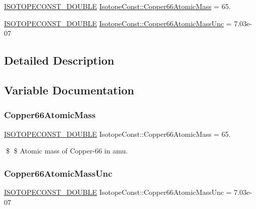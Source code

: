 \begin{DoxyCompactItemize}
\item 
\mbox{\hyperlink{group___isotope_const-_macros_ga8f45a7272ce02c0b4c65c44636ed719a}{I\+S\+O\+T\+O\+P\+E\+C\+O\+N\+S\+T\+\_\+\+D\+O\+U\+B\+LE}} \mbox{\hyperlink{group___isotope_const-_copper-_cu66_ga62a3b4ae1fc72746dd9d9cb74024d3b8}{Isotope\+Const\+::\+Copper66\+Atomic\+Mass}} = 65.
\item 
\mbox{\hyperlink{group___isotope_const-_macros_ga8f45a7272ce02c0b4c65c44636ed719a}{I\+S\+O\+T\+O\+P\+E\+C\+O\+N\+S\+T\+\_\+\+D\+O\+U\+B\+LE}} \mbox{\hyperlink{group___isotope_const-_copper-_cu66_gacd2aaf9bba63e92c372d9fff5aef5cf2}{Isotope\+Const\+::\+Copper66\+Atomic\+Mass\+Unc}} = 7.\+03e-\/07
\end{DoxyCompactItemize}


\subsection{Detailed Description}


\subsection{Variable Documentation}
\mbox{\label{group___isotope_const-_copper-_cu66_ga62a3b4ae1fc72746dd9d9cb74024d3b8}} 
\subsubsection{\texorpdfstring{Copper66\+Atomic\+Mass}{Copper66AtomicMass}}
{\footnotesize\ttfamily \mbox{\hyperlink{group___isotope_const-_macros_ga8f45a7272ce02c0b4c65c44636ed719a}{I\+S\+O\+T\+O\+P\+E\+C\+O\+N\+S\+T\+\_\+\+D\+O\+U\+B\+LE}} Isotope\+Const\+::\+Copper66\+Atomic\+Mass = 65.}

\$ \$ Atomic mass of Copper-\/66 in amu. \mbox{\label{group___isotope_const-_copper-_cu66_gacd2aaf9bba63e92c372d9fff5aef5cf2}} 
\subsubsection{\texorpdfstring{Copper66\+Atomic\+Mass\+Unc}{Copper66AtomicMassUnc}}
{\footnotesize\ttfamily \mbox{\hyperlink{group___isotope_const-_macros_ga8f45a7272ce02c0b4c65c44636ed719a}{I\+S\+O\+T\+O\+P\+E\+C\+O\+N\+S\+T\+\_\+\+D\+O\+U\+B\+LE}} Isotope\+Const\+::\+Copper66\+Atomic\+Mass\+Unc = 7.\+03e-\/07}

